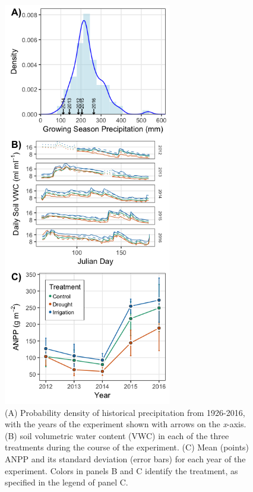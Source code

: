 \documentclass[fleqn,10pt,lineno]{wlpeerj} %
\begin{document}
\begin{figure}[!ht]
  \centering
      \includegraphics[height=7in]{../figures/data_panels.png}
  \caption{(A) Probability density of historical precipitation from 1926-2016, with the years of the experiment shown with arrows on the \emph{x}-axis. (B)  soil volumetric water content (VWC) in each of the three treatments during the course of the experiment.  (C) Mean (points) ANPP and its standard deviation (error bars) for each year of the experiment. Colors in panels B and C identify the treatment, as specified in the legend of panel C.}
\end{figure}

\newpage{}
\end{document}
